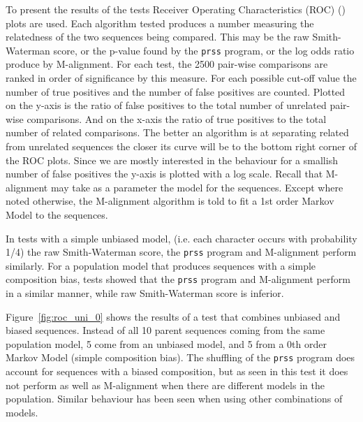 \documentclass[letterpaper,11pt,oneside]{article}
\begin{document}
\begin{multicols}{2}
To present the results of the tests Receiver Operating Characteristics (ROC)
(\cite{gribskov96, brenner98}) plots are used.  Each algorithm tested produces
a number measuring the relatedness of the two sequences being compared.  This
may be the raw Smith-Waterman score, or the p-value found by the \verb!prss! 
program, or the log odds ratio produce by M-alignment.  For each test, the
2500 pair-wise comparisons are ranked in order of significance by this
measure.  For each possible cut-off value the number of true positives and the
number of false positives are counted.  Plotted on the y-axis is the ratio of
false positives to the total number of unrelated pair-wise comparisons.  And
on the x-axis the ratio of true positives to the total number of related
comparisons.  The better an algorithm is at separating related from unrelated
sequences the closer its curve will be to the bottom right corner of the ROC
plots.  Since we are mostly interested in the behaviour for a smallish number
of false positives the y-axis is plotted with a log scale.  Recall that
M-alignment may take as a parameter the model for the sequences.  Except where
noted otherwise, the M-alignment algorithm is told to fit a 1st order Markov
Model to the sequences.

In tests with a simple unbiased model, (i.e. each character occurs with
probability 1/4) the raw Smith-Waterman score, the \verb!prss! program and
M-alignment perform similarly.  For a population model that produces sequences
with a simple composition bias, tests showed that the \verb!prss! program and
M-alignment perform in a similar manner, while raw Smith-Waterman score is
inferior.

Figure~\ref{fig:roc_uni_0} shows the results of a test that combines unbiased
and biased sequences.  Instead of all 10 parent sequences coming from the same
population model, 5 come from an unbiased model, and 5 from a 0th order Markov
Model (simple composition bias).  The shuffling of the \verb!prss! program
does account for sequences with a biased composition, but as seen in this test
it does not perform as well as M-alignment when there are different models in
the population.  Similar behaviour has been seen when using other combinations
of models.



\end{multicols}
\end{document}
